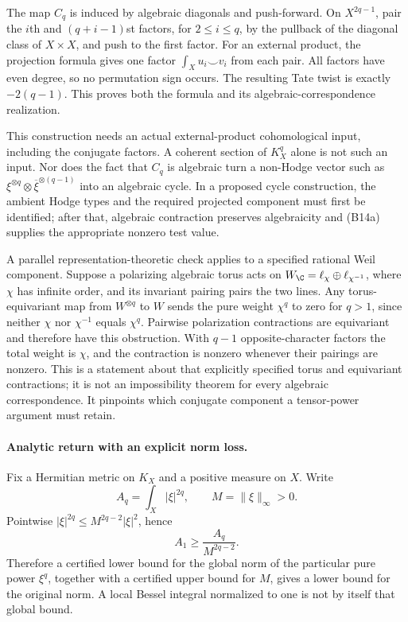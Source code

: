 \documentclass[11pt]{article}
\theoremstyle{definition}\newtheorem{definition}[theorem]{Definition}\newtheorem{remark}[theorem]{Remark}
\begin{document}
The map $C_q$ is induced by algebraic diagonals and push-forward. On $X^{2q-1}$, pair the $i$th and $(q+i-1)$st factors, for $2\leq i\leq q$, by the pullback of the diagonal class of $X\times X$, and push to the first factor. For an external product, the projection formula gives one factor $\int_Xu_i\smile v_i$ from each pair. All factors have even degree, so no permutation sign occurs. The resulting Tate twist is exactly $-2(q-1)$. This proves both the formula and its algebraic-correspondence realization.

This construction needs an actual external-product cohomological input, including the conjugate factors. A coherent section of $K_X^q$ alone is not such an input. Nor does the fact that $C_q$ is algebraic turn a non-Hodge vector such as $\xi^{\otimes q}\otimes\overline\xi^{\otimes(q-1)}$ into an algebraic cycle. In a proposed cycle construction, the ambient Hodge types and the required projected component must first be identified; after that, algebraic contraction preserves algebraicity and (B14a) supplies the appropriate nonzero test value.

A parallel representation-theoretic check applies to a specified rational Weil component. Suppose a polarizing algebraic torus acts on
$W_\C=\ell_\chi\oplus\ell_{\chi^{-1}}$, where $\chi$ has infinite order, and its invariant pairing pairs the two lines. Any torus-equivariant map from $W^{\otimes q}$ to $W$ sends the pure weight $\chi^q$ to zero for $q>1$, since neither $\chi$ nor $\chi^{-1}$ equals $\chi^q$. Pairwise polarization contractions are equivariant and therefore have this obstruction. With $q-1$ opposite-character factors the total weight is $\chi$, and the contraction is nonzero whenever their pairings are nonzero. This is a statement about that explicitly specified torus and equivariant contractions; it is not an impossibility theorem for every algebraic correspondence. It pinpoints which conjugate component a tensor-power argument must retain.

\paragraph{Analytic return with an explicit norm loss.}
Fix a Hermitian metric on $K_X$ and a positive measure on $X$. Write
\[
 A_q=\int_X|\xi|^{2q},\qquad M=\|\xi\|_\infty>0.
\]
Pointwise $|\xi|^{2q}\leq M^{2q-2}|\xi|^2$, hence
\[
 A_1\geq \frac{A_q}{M^{2q-2}}.
 \tag{B14b}
\]
Therefore a certified lower bound for the global norm of the particular pure power $\xi^q$, together with a certified upper bound for $M$, gives a lower bound for the original norm. A local Bessel integral normalized to one is not by itself that global bound.
\end{document}

